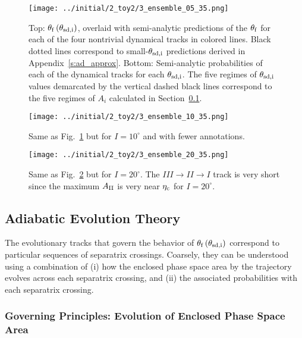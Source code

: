 \documentclass[
        fleqn,
        usenatbib,
        referee,
    ]{mnras}
\newcommand*{\p}[1]{\left(#1\right)}
\begin{document}
\begin{figure}
    \centering
    \texttt{[image: ../initial/2\_toy2/3\_ensemble\_05\_35.png]}
    \caption{Top: $\theta_{\rm f}\p{\theta_{\rm sd, i}}$, overlaid with
    semi-analytic predictions of the $\theta_{\rm  f}$ for each of the four
    nontrivial dynamical tracks in colored lines. Black dotted lines correspond
    to small-$\theta_{\rm sd, i}$ predictions derived in
    Appendix~\ref{s:ad_approx}. Bottom: Semi-analytic probabilities of each of
    the dynamical tracks for each $\theta_{\rm sd, i}$. The five regimes of
    $\theta_{\rm sd, i}$ values demarcated by the vertical dashed black lines
    correspond to the five regimes of $A_i$ calculated in
    Section~\ref{ss:zone_transitions}.}\label{fig:ad_ensemble}
\end{figure}
\begin{figure}
    \centering
    \texttt{[image: ../initial/2\_toy2/3\_ensemble\_10\_35.png]}
    \caption{Same as Fig.~\ref{fig:ad_ensemble} but for $I =
    10^\circ$ and with fewer annotations.}\label{fig:3_ensemble_10_35}
\end{figure}
\begin{figure}
    \centering
    \texttt{[image: ../initial/2\_toy2/3\_ensemble\_20\_35.png]}
    \caption{Same as Fig.~\ref{fig:3_ensemble_10_35} but for $I = 20^\circ$. The
    $III \to II \to I$ track is very short since the maximum $A_{\rm II}$ is very
    near $\eta_{\rm c}$ for $I = 20^\circ$.}\label{fig:3_ensemble_20_35}
\end{figure}

\subsection{Adiabatic Evolution Theory}\label{ss:zone_transitions}

The evolutionary tracks that govern the behavior of $\theta_{\rm
f}\p{\theta_{\rm sd, i}}$ correspond to particular sequences of separatrix
crossings. Coarsely, they can be understood using a combination of (i) how the
enclosed phase space area by the trajectory evolves across each separatrix
crossing, and (ii) the associated probabilities with each separatrix crossing.

\subsubsection{Governing Principles: Evolution of Enclosed Phase Space
Area}\label{sss:a_evo}
\end{document}
